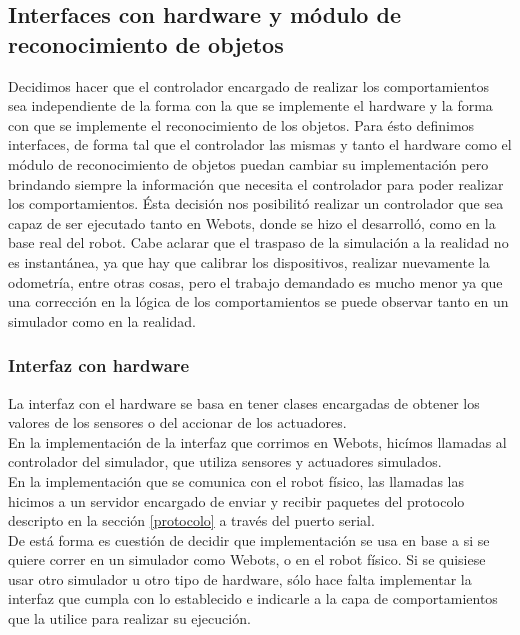 \subsection{Interfaces con hardware y m\'odulo de reconocimiento de objetos}
\label{interfaces}
Decidimos hacer que el controlador encargado de realizar los comportamientos
sea independiente de la forma con la que se implemente el hardware y la forma
con que se implemente el reconocimiento de los objetos. Para \'esto definimos
interfaces, de forma tal que el controlador las mismas y tanto el hardware
como el m\'odulo de reconocimiento de objetos puedan cambiar su
implementaci\'on pero brindando siempre la informaci\'on que necesita el
controlador para poder realizar los comportamientos. \'Esta decisi\'on nos
posibilit\'o realizar un controlador que sea capaz de ser ejecutado tanto en
Webots, donde se hizo el desarroll\'o, como en la base real del robot. Cabe
aclarar que el traspaso de la simulaci\'on a la realidad no es instant\'anea,
ya que hay que calibrar los dispositivos, realizar nuevamente la odometr\'ia,
entre otras cosas, pero el trabajo demandado es mucho menor ya que una
correcci\'on en la l\'ogica de los comportamientos se puede observar tanto en
un simulador como en la realidad.

\subsubsection{Interfaz con hardware}
La interfaz con el hardware se basa en tener clases encargadas de obtener los
valores de los sensores o del accionar de los actuadores.
\\En la implementaci\'on de la interfaz que corrimos en Webots, hic\'imos
llamadas al controlador del simulador, que utiliza sensores y actuadores
simulados.
\\En la implementaci\'on que se comunica con el robot f\'isico,
las llamadas las hicimos a un servidor encargado de enviar y recibir paquetes
del protocolo descripto en la secci\'on \ref{protocolo} a trav\'es del puerto
serial.
\\De est\'a forma es cuesti\'on de decidir que implementaci\'on se usa en base
a si se quiere correr en un simulador como Webots, o en el robot f\'isico. Si
se quisiese usar otro simulador u otro tipo de hardware, s\'olo hace falta
implementar la interfaz que cumpla con lo establecido e indicarle a la capa de
comportamientos que la utilice para realizar su ejecuci\'on.

